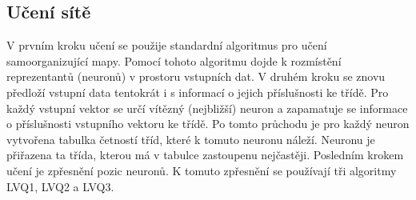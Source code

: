 \documentclass[11pt,twoside,a4paper]{book}
\begin{document}
\subsection{Učení sítě}
V prvním kroku učení se použije standardní algoritmus pro učení samoorganizující mapy. Pomocí tohoto algoritmu dojde k rozmístění reprezentantů (neuronů) v prostoru vstupních dat. V druhém kroku se znovu předloží vstupní data tentokrát i s informací o jejich příslušnosti ke třídě. Pro každý vstupní vektor se určí vítězný (nejbližší) neuron a zapamatuje se informace o příslušnosti vstupního vektoru ke třídě. Po tomto průchodu je pro každý neuron vytvořena tabulka četností tříd, které k tomuto neuronu náleží. Neuronu je přiřazena ta třída, kterou má v tabulce zastoupenu nejčastěji. Posledním krokem učení je zpřesnění pozic neuronů. K tomuto zpřesnění se používají tři algoritmy LVQ1, LVQ2 a LVQ3.
\end{document}
